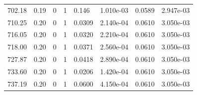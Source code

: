 \documentclass[preview]{standalone}
\begin{document}
{{{{\begin{tabular}{L{1.2cm}C{1.2cm} C{0.3cm}C{0.5cm} C{1.4cm}C{1.4cm} C{1.4cm}C{1.4cm}}
  702.18  &  0.19  & 0     &  1 &  0.146  & 1.010e-03  & 0.0589 &  2.947e-03   \\ 
  710.25  &  0.20  & 0     &  1 &  0.0309  & 2.140e-04  & 0.0610 &  3.050e-03   \\ 
  716.05  &  0.20  & 0     &  1 &  0.0320  & 2.210e-04  & 0.0610 &  3.050e-03   \\ 
  718.00  &  0.20  & 0     &  1 &  0.0371  & 2.560e-04  & 0.0610 &  3.050e-03   \\ 
  727.87  &  0.20  & 0     &  1 &  0.0418  & 2.890e-04  & 0.0610 &  3.050e-03   \\ 
  733.60  &  0.20  & 0     &  1 &  0.0206  & 1.420e-04  & 0.0610 &  3.050e-03   \\ 
  737.19  &  0.20  & 0     &  1 &  0.0600  & 4.150e-04  & 0.0610 &  3.050e-03   \\ 
\hline 
\end{tabular} 

}}}}
\end{document}
